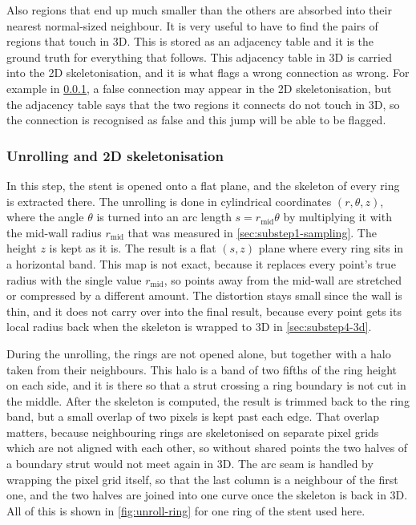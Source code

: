 Also regions that end up much smaller than the others are absorbed into their nearest normal-sized neighbour. It is very useful to have to find the pairs of regions that touch in 3D. This is stored as an adjacency table and it is the ground truth for everything that follows. This adjacency table in 3D is carried into the 2D skeletonisation, and it is what flags a wrong connection as wrong. For example in \cref{sec:substep3-skeleton2d}, a false connection may appear in the 2D skeletonisation, but the adjacency table says that the two regions it connects do not touch in 3D, so the connection is recognised as false and this jump will be able to be flagged.

\subsubsection{Unrolling and 2D skeletonisation}
\label{sec:substep3-skeleton2d}

In this step, the stent is opened onto a flat plane, and the skeleton of every ring is extracted there. The unrolling is done in cylindrical coordinates $(r, \theta, z)$, where the angle $\theta$ is turned into an arc length $s = r_\mathrm{mid} \theta$ by multiplying it with the mid-wall radius $r_\mathrm{mid}$ that was measured in \cref{sec:substep1-sampling}. The height $z$ is kept as it is. The result is a flat $(s, z)$ plane where every ring sits in a horizontal band. This map is not exact, because it replaces every point's true radius with the single value $r_\mathrm{mid}$, so points away from the mid-wall are stretched or compressed by a different amount. The distortion stays small since the wall is thin, and it does not carry over into the final result, because every point gets its local radius back when the skeleton is wrapped to 3D in \cref{sec:substep4-3d}.

During the unrolling, the rings are not opened alone, but together with a halo taken from their neighbours. This halo is a band of two fifths of the ring height on each side, and it is there so that a strut crossing a ring boundary is not cut in the middle. After the skeleton is computed, the result is trimmed back to the ring band, but a small overlap of two pixels is kept past each edge. That overlap matters, because neighbouring rings are skeletonised on separate pixel grids which are not aligned with each other, so without shared points the two halves of a boundary strut would not meet again in 3D. The arc seam is handled by wrapping the pixel grid itself, so that the last column is a neighbour of the first one, and the two halves are joined into one curve once the skeleton is back in 3D. All of this is shown in \cref{fig:unroll-ring} for one ring of the stent used here.

